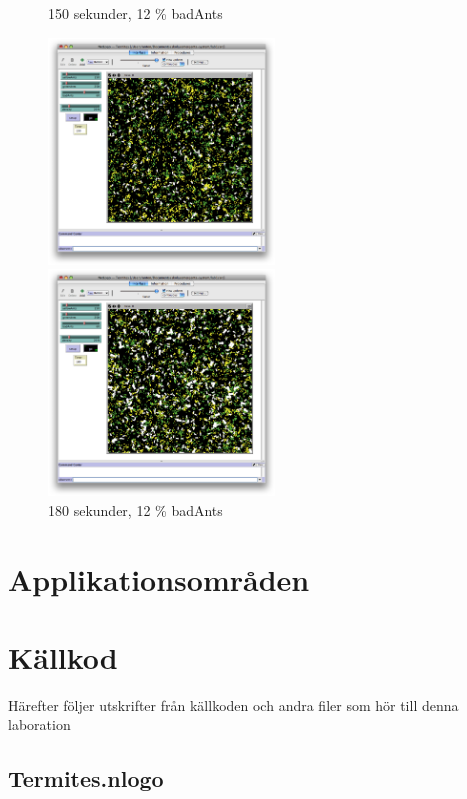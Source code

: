 \documentclass[titlepage, a4paper, 12pt]{article}
\begin{document}
\begin{figure}
  \begin{minipage}[b]{0.5\linewidth} %
    \centering
    \caption{150 sekunder, 12 \% badAnts}
    \includegraphics[width=6cm]{images/60-bad-150.png}
  \end{minipage}
  \hspace{0.5cm} %
  \begin{minipage}[b]{0.5\linewidth}
    \centering
    \caption{180 sekunder, 12 \% badAnts}
    \includegraphics[width=6cm]{images/60-bad-180.png}
  \end{minipage}
\end{figure}

\section{Applikationsområden}




\newpage
\appendix
{}
\section{Källkod}\label{sec:kallkod}
Härefter följer utskrifter från källkoden och andra filer som hör till
denna laboration

\subsection{Termites.nlogo}\label{Termites.nlogo}
\begin{footnotesize}
  
\end{footnotesize}
\end{document}
